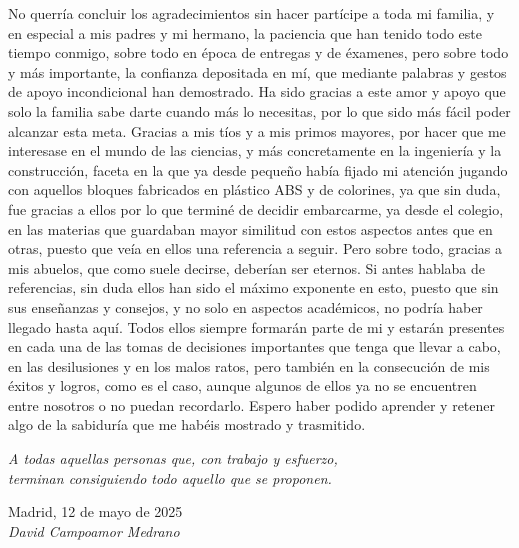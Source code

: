 No querría concluir los agradecimientos sin hacer partícipe a toda mi familia, y en especial a mis padres y mi hermano, la paciencia que han tenido todo este tiempo conmigo, sobre todo en época de entregas y de éxamenes, pero sobre todo y más importante, la confianza depositada en mí, que mediante palabras y gestos de apoyo incondicional han demostrado. Ha sido gracias a este amor y apoyo que solo la familia sabe darte cuando más lo necesitas, por lo que sido más fácil poder alcanzar esta meta. Gracias a mis tíos y a mis primos mayores, por hacer que me interesase en el mundo de las ciencias, y más concretamente en la ingeniería y la construcción, faceta en la que ya desde pequeño había fijado mi atención jugando con aquellos bloques fabricados en plástico ABS y de colorines, ya que sin duda, fue gracias a ellos por lo que terminé de decidir embarcarme, ya desde el colegio, en las materias que guardaban mayor similitud con estos aspectos antes que en otras, puesto que veía en ellos una referencia a seguir. Pero sobre todo, gracias a mis abuelos, que como suele decirse, deberían ser eternos. Si antes hablaba de referencias, sin duda ellos han sido el máximo exponente en esto, puesto que sin sus enseñanzas y consejos, y no solo en aspectos académicos, no podría haber llegado hasta aquí. Todos ellos siempre formarán parte de mi y estarán presentes en cada una de las tomas de decisiones importantes que tenga que llevar a cabo, en las desilusiones y en los malos ratos, pero también en la consecución de mis éxitos y logros, como es el caso, aunque algunos de ellos ya no se encuentren entre nosotros o no puedan recordarlo. Espero haber podido aprender y retener algo de la sabiduría que me habéis mostrado y trasmitido.\\

\begin{flushright}
		\emph{A todas aquellas personas que, con trabajo y esfuerzo,\\
 terminan consiguiendo todo aquello que se proponen.}\\
		\par
		\vspace{1.0 cm}
		Madrid, 12 de mayo de 2025\\ %
		\emph{David Campoamor Medrano}
\end{flushright}

\thispagestyle{empty}

